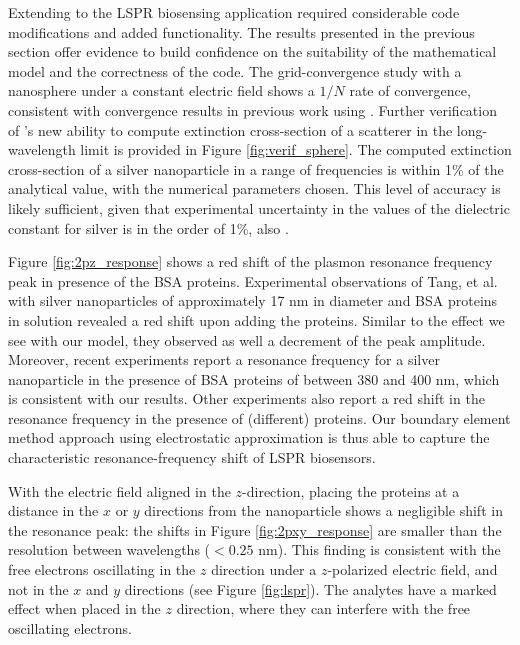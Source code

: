
Extending \pygbe to the LSPR biosensing application required considerable code 
modifications and added functionality. The results presented in the previous section 
offer evidence to build confidence on the suitability of the mathematical model 
and the correctness of the code.
The grid-convergence study with a nanosphere under a constant electric field 
shows a $1/N$ rate of convergence, consistent with convergence results 
in previous work using \pygbe \cite{CooperBardhanBarba2013}.
Further verification of \pygbe's new ability to compute extinction cross-section
of a scatterer in the long-wavelength limit is provided in Figure \ref{fig:verif_sphere}.
The computed extinction cross-section of a silver nanoparticle in a range of frequencies 
is within 1\% of the analytical value, with the numerical parameters chosen.
This level of accuracy is likely sufficient, given that experimental uncertainty in 
the values of the dielectric constant for silver is in the order of 1\%, also \cite{JohnsonChristy1972}.


Figure \ref{fig:2pz_response} shows a red shift of the plasmon resonance frequency peak in presence of the BSA proteins.
Experimental observations of Tang, et al.~\cite{TangETal2010} with silver nanoparticles of approximately 17 nm in diameter and BSA proteins in solution revealed a red shift upon adding the proteins. 
Similar to the effect we see with our model, they observed as well a decrement of 
the peak amplitude.
Moreover, recent experiments \cite{PuETal2018} report a resonance frequency for a silver nanoparticle in the presence of BSA proteins of between 380 and 400 nm, which is consistent with our results.
Other experiments \cite{RaphaelETal2013} also report a red shift in the resonance frequency in the presence of (different) proteins.
Our boundary element method approach using electrostatic
approximation is thus able to capture the characteristic resonance-frequency 
shift of LSPR biosensors.

With the electric field aligned in the $z$-direction, placing the proteins at a distance
in the $x$ or $y$ directions from the nanoparticle shows a negligible shift in the 
resonance peak: the shifts in Figure \ref{fig:2pxy_response} 
are smaller than the resolution between wavelengths ($< 0.25$ nm).
This finding is consistent with the free electrons oscillating in the $z$ direction
under a $z$-polarized electric field, and not in the $x$ and $y$ directions
(see Figure \ref{fig:lspr}). 
The analytes have a marked effect when placed in the $z$ direction, where
they can interfere with the free oscillating electrons. 

